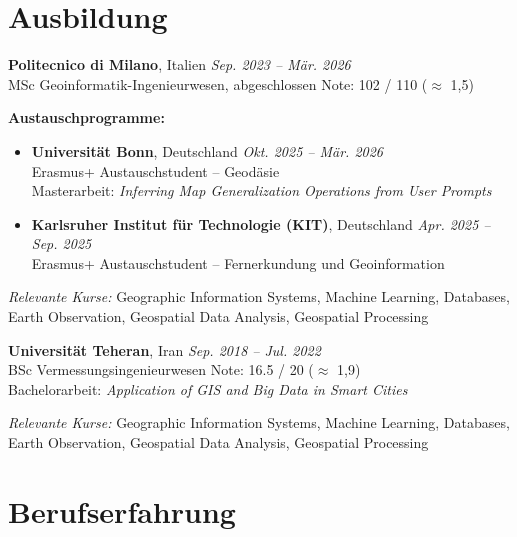 \documentclass[a4paper,10pt]{article}
\begin{document}
\section*{Ausbildung}

\textbf{Politecnico di Milano}, Italien \hfill \textit{Sep. 2023 -- Mär. 2026}\\
MSc Geoinformatik-Ingenieurwesen, abgeschlossen \hfill Note: 102 / 110 ($\approx$ 1,5)

\textbf{Austauschprogramme:}
\begin{itemize}[leftmargin=*, itemsep=0.2em]
    \item \textbf{Universität Bonn}, Deutschland \hfill \textit{Okt. 2025 -- Mär. 2026}\\
    Erasmus+ Austauschstudent -- Geodäsie\\
    Masterarbeit: \textit{Inferring Map Generalization Operations from User Prompts}\\
    
    \item \textbf{Karlsruher Institut für Technologie (KIT)}, Deutschland \hfill \textit{Apr. 2025 -- Sep. 2025}\\
    Erasmus+ Austauschstudent -- Fernerkundung und Geoinformation
\end{itemize}

\textit{Relevante Kurse:} Geographic Information Systems, Machine Learning, Databases, Earth Observation, Geospatial Data Analysis, Geospatial Processing

\vspace{0.4em}

\textbf{Universität Teheran}, Iran \hfill \textit{Sep. 2018 -- Jul. 2022}\\
BSc Vermessungsingenieurwesen \hfill Note: 16.5 / 20 ($\approx$ 1,9)\\
Bachelorarbeit: \textit{Application of GIS and Big Data in Smart Cities}

\textit{Relevante Kurse:} Geographic Information Systems, Machine Learning, Databases, Earth Observation, Geospatial Data Analysis, Geospatial Processing

\section*{Berufserfahrung}
\end{document}
